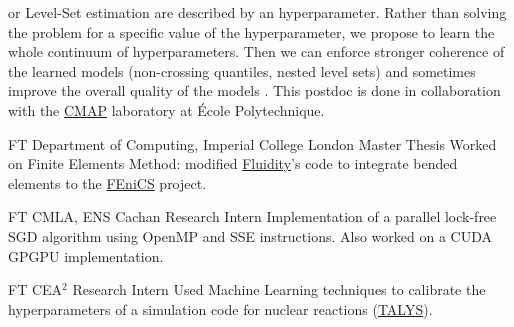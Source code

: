 \documentclass[10pt]{article} %
\begin{document}
\begin{paracol}{2}
{or Level-Set estimation are described by an hyperparameter. Rather than solving
the problem for a specific value of the hyperparameter, we propose to learn the
whole continuum of hyperparameters. Then we can enforce stronger coherence of
the learned models (non-crossing quantiles, nested level sets) and sometimes
improve the overall quality of the models \citep{brault2018infinite}.
  This postdoc is done in collaboration with the
\href{https://portail.polytechnique.edu/cmap/fr}{CMAP} laboratory at \'Ecole
Polytechnique.
}\par \newpage %
{FT}
{Department of Computing, Imperial College London}
{Master Thesis}
{Worked on Finite Elements Method: modified
\href{http://fluidityproject.github.io/publications/}{Fluidity}'s code to
integrate bended elements to the \href{https://fenicsproject.org/}{FEniCS}
project.}\par
{}
{FT}
{CMLA, ENS Cachan}
{Research Intern}
{Implementation of a parallel lock-free SGD algorithm using OpenMP and SSE
instructions.  Also worked on a CUDA GPGPU implementation.}\par
{}
{FT}
{CEA${}^2$}
{Research Intern}
{Used Machine Learning techniques to calibrate the hyperparameters of a
simulation code for nuclear reactions
(\href{http://www.talys.eu/home/}{TALYS}).}\par
%
%

\end{paracol}
\end{document}
